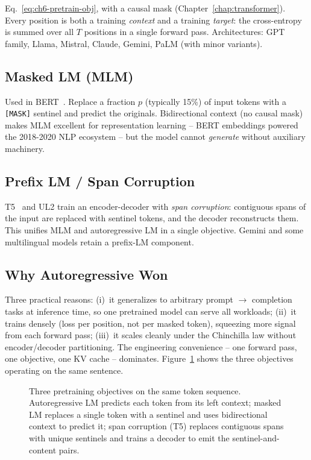 Eq.~\eqref{eq:ch6-pretrain-obj}, with a causal mask (Chapter~\ref{chap:transformer}).
Every position is both a training \emph{context} and a training
\emph{target}: the cross-entropy is summed over all $T$ positions in a
single forward pass. Architectures: GPT family, Llama, Mistral,
Claude, Gemini, PaLM (with minor variants).

\subsection{Masked LM (MLM)}

Used in BERT~\citep{devlin2019bert}. Replace a fraction $p$ (typically
15\%) of input tokens with a \texttt{[MASK]} sentinel and predict the
originals. Bidirectional context (no causal mask) makes MLM excellent
for representation learning -- BERT embeddings powered the 2018-2020
NLP ecosystem -- but the model cannot \emph{generate} without
auxiliary machinery.

\subsection{Prefix LM / Span Corruption}

T5~\citep{raffel2020t5} and UL2 train an encoder-decoder with
\emph{span corruption}: contiguous spans of the input are replaced
with sentinel tokens, and the decoder reconstructs them. This
unifies MLM and autoregressive LM in a single objective. Gemini and
some multilingual models retain a prefix-LM component.

\subsection{Why Autoregressive Won}

Three practical reasons:
(i)~it generalizes to arbitrary prompt $\to$ completion tasks at
inference time, so one pretrained model can serve all workloads;
(ii)~it trains densely (loss per position, not per masked token),
squeezing more signal from each forward pass;
(iii)~it scales cleanly under the Chinchilla law without
encoder/decoder partitioning. The engineering convenience -- one
forward pass, one objective, one KV cache -- dominates.
Figure~\ref{fig:pretraining_objectives} shows the three objectives
operating on the same sentence.

\begin{figure}[H]
  \centering
  
  \caption{Three pretraining objectives on the same token
           sequence. Autoregressive LM predicts each token from
           its left context; masked LM replaces a single token
           with a sentinel and uses bidirectional context to
           predict it; span corruption (T5) replaces contiguous
           spans with unique sentinels and trains a decoder to
           emit the sentinel-and-content pairs.}
  \label{fig:pretraining_objectives}
\end{figure}

